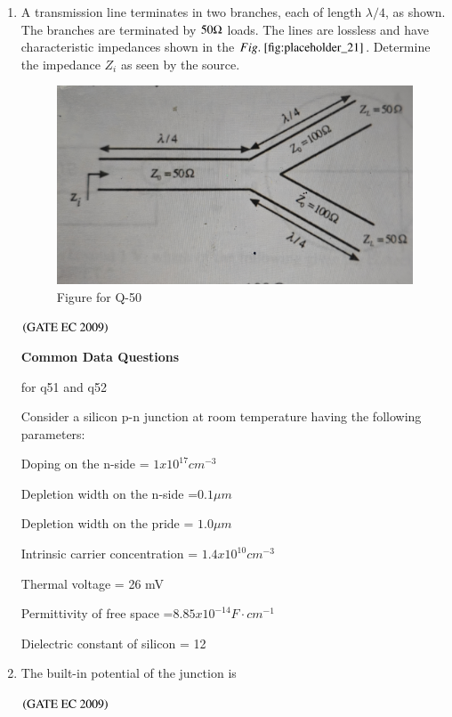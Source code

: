 \documentclass[journal,12pt,onecolumn]{IEEEtran}
\theoremstyle{remark}
\begin{document}
\begin{enumerate}[start=1, label={Q\arabic*.}]
\item A transmission line terminates in two branches, each of length $\lambda/4$, as shown. The branches are terminated by $50 \ohm$ loads. The lines are lossless and have characteristic impedances shown in the $\figref{fig:placeholder_21}$. Determine the impedance $Z_i$ as seen by the source.
\begin{figure}[H]
    \centering
    \includegraphics[width=0.5\columnwidth]{figs/fig_21.jpg}
    \caption{\centering Figure for Q-50}
    \label{fig:placeholder_20}
\end{figure}
\begin{enumerate}
\end{enumerate}
\hfill $\left(\text{GATE EC 2009}\right)$

\textbf{Common Data Questions}

for q51 and q52

Consider a silicon p-n junction at room temperature having the following parameters:

Doping on the n-side = $1 x 10^{17} cm^{-3}$

Depletion width on the n-side =$ 0.1 \mu m $

Depletion width on the pride = $1.0 \mu m $

Intrinsic carrier concentration = $1.4 x 10^{10} cm^{-3} $

Thermal voltage = 26 mV 

Permittivity of free space =$8.85 x 10^{-14 }F \cdot cm^{-1} $

Dielectric constant of silicon = 12
\item The built-in potential of the junction is 
\begin{enumerate}
\end{enumerate}
\hfill $\left(\text{GATE EC 2009}\right)$


\end{enumerate}
\end{document}
